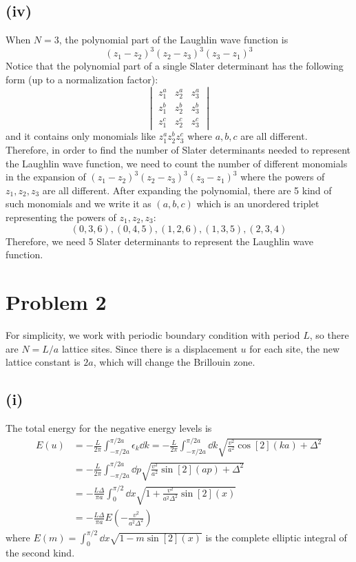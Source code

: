 \documentclass{article}
\begin{document}
\subsection*{(iv)}
When $N=3$, the polynomial part of the Laughlin wave function is
\begin{equation}
    (z_1-z_2)^3(z_2-z_3)^3(z_3-z_1)^3
\end{equation}
Notice that the polynomial part of a single Slater determinant has the following form (up to a normalization factor):
\begin{equation}
    \begin{vmatrix}
        z_1^{a} & z_2^{a} & z_3^{a}\\
        z_1^{b} & z_2^{b} & z_3^{b}\\
        z_1^{c} & z_2^{c} & z_3^{c}
    \end{vmatrix}
\end{equation}
and it contains only monomials like $z_1^{a}z_2^{b}z_3^{c}$ where $a,b,c$ are all different.
Therefore, in order to find the number of Slater determinants needed to represent the Laughlin wave function, we need to count the number of different monomials in the expansion of $(z_1-z_2)^3(z_2-z_3)^3(z_3-z_1)^3$ where the powers of $z_1,z_2,z_3$ are all different.
After expanding the polynomial, there are 5 kind of such monomials and we write it as $(a,b,c)$ which is an unordered triplet representing the powers of $z_1,z_2,z_3$:
\begin{equation}
    (0,3,6), (0,4,5), (1,2,6), (1,3,5), (2,3,4)
\end{equation}
Therefore, we need 5 Slater determinants to represent the Laughlin wave function.

\section*{Problem 2}
For simplicity, we work with periodic boundary condition with period $L$, so there are $N=L/a$ lattice sites.
Since there is a displacement $u$ for each site, the new lattice constant is $2a$, which will change the Brillouin zone.
\subsection*{(i)}
The total energy for the negative energy levels is
\begin{equation}
    \begin{split}
        E(u)&=-\frac{L}{2\pi}\int_{-\pi/2a}^{\pi/2a}\epsilon_k \dd{k}=-\frac{L}{2\pi}\int_{-\pi/2a}^{\pi/2a} \dd{k}\sqrt{\frac{v^2}{a^2}\cos[2](ka)+\Delta^2}\\
            &=-\frac{L}{2\pi}\int_{-\pi/2a}^{\pi/2a}\dd{p}\sqrt{\frac{v^2}{a^2}\sin[2](ap)+\Delta^2}\\
            &=-\frac{L\Delta}{\pi a}\int_0^{\pi/2}\dd{x}\sqrt{1+\frac{v^2}{a^2\Delta^2}\sin[2](x)}\\
            &=-\frac{L\Delta}{\pi a}E\left(-\frac{v^2}{a^2\Delta^2}\right)
    \end{split}
\end{equation}
where $E(m)=\int_0^{\pi/2}\dd{x}\sqrt{1-m\sin[2](x)}$ is the complete elliptic integral of the second kind.
\end{document}
